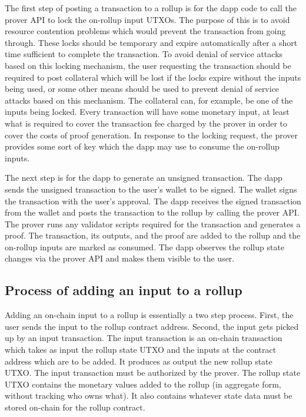 \documentclass[12pt]{article}
\begin{document}
The first step of posting a transaction to a rollup is for the dapp code to call the prover API to lock the on-rollup input UTXOs. The purpose of this is to avoid resource contention problems which would prevent the transaction from going through. These locks should be temporary and expire automatically after a short time sufficient to complete the transaction. To avoid denial of service attacks based on this locking mechanism, the user requesting the transaction should be required to post collateral which will be lost if the locks expire without the inputs being used, or some other means should be used to prevent denial of service attacks based on this mechanism. The collateral can, for example, be one of the inputs being locked. Every transaction will have some monetary input, at least what is required to cover the transaction fee charged by the prover in order to cover the costs of proof generation. In response to the locking request, the prover provides some sort of key which the dapp may use to consume the on-rollup inputs. 

The next step is for the dapp to generate an unsigned transaction. The dapp sends the unsigned transaction to the user's wallet to be signed. The wallet signs the transaction with the user's approval. The dapp receives the signed transaction from the wallet and posts the transaction to the rollup by calling the prover API. The prover runs any validator scripts required for the transaction and generates a proof. The transaction, its outputs, and the proof are added to the rollup and the on-rollup inputs are marked as consumed. The dapp observes the rollup state changes via the prover API and makes them visible to the user.


\subsection{Process of adding an input to a rollup}

Adding an on-chain input to a rollup is essentially a two step process. First, the user sends the input to the rollup contract address. Second, the input gets picked up by an input transaction. The input transaction is an on-chain transaction which takes as input the rollup state UTXO and the inputs at the contract address which are to be added. It produces as output the new rollup state UTXO. The input transaction must be authorized by the prover. The rollup state UTXO contains the monetary values added to the rollup (in aggregate form, without tracking who owns what). It also contains whatever state data must be stored on-chain for the rollup contract.
\end{document}
